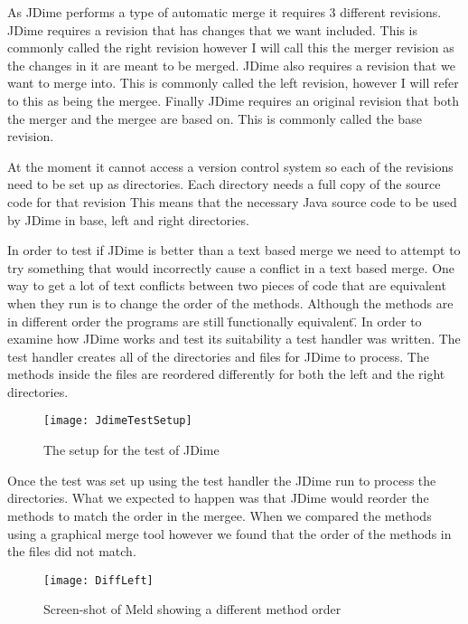 As JDime performs a type of automatic merge it requires 3 different revisions.
JDime requires a revision that has changes that we want included.  This is commonly called the right revision however I will call this the merger revision as the changes in it are meant to be merged.
JDime also requires a revision that we want to merge into.  This is commonly called the left revision, however I will refer to this as being the mergee. 
Finally JDime requires an original revision that both the merger and the mergee are based on.
This is commonly called the base revision.

At the moment it cannot access a version control system so each of the revisions need to be set up as directories.
Each directory needs a full copy of the source code for that revision 
This means that the necessary Java source code to be used by JDime in base, left and right directories.


In order to test if JDime is better than a text based merge we need to attempt to try something that would incorrectly cause a conflict in a text based merge.
One way to get a lot of text conflicts between two pieces of code that are equivalent when they run is to change the order of the methods.
Although the methods are in different order the programs are still \"functionally equivalent\".
In order to examine how JDime works and test its suitability a test handler was written.
The test handler creates all of the directories and files for JDime to process.
The methods inside the files are reordered differently for both the left and the right directories.

\begin{figure}[h]
\begin{center}
\texttt{[image: JdimeTestSetup]}
\end{center}
 \caption{The setup for the test of JDime}
\end{figure}

Once the test was set up using the test handler the JDime run to process the directories.
What we expected to happen was that JDime would reorder the methods to match the order in the mergee. When we compared the methods using a graphical merge tool however we found that the order of the methods in the files did not match.

\begin{figure}[h]
\begin{center}
\texttt{[image: DiffLeft]}
\end{center}
 \caption{Screen-shot of Meld showing a different method order}
\end{figure}

